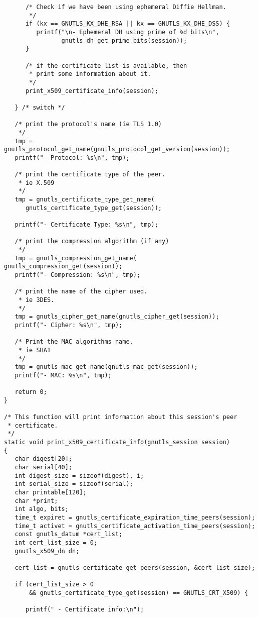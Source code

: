 \begin{verbatim}
      /* Check if we have been using ephemeral Diffie Hellman.
       */
      if (kx == GNUTLS_KX_DHE_RSA || kx == GNUTLS_KX_DHE_DSS) {
         printf("\n- Ephemeral DH using prime of %d bits\n",
                gnutls_dh_get_prime_bits(session));
      }

      /* if the certificate list is available, then
       * print some information about it.
       */
      print_x509_certificate_info(session);

   } /* switch */

   /* print the protocol's name (ie TLS 1.0) 
    */
   tmp = gnutls_protocol_get_name(gnutls_protocol_get_version(session));
   printf("- Protocol: %s\n", tmp);

   /* print the certificate type of the peer.
    * ie X.509
    */
   tmp = gnutls_certificate_type_get_name(
      gnutls_certificate_type_get(session));

   printf("- Certificate Type: %s\n", tmp);

   /* print the compression algorithm (if any)
    */
   tmp = gnutls_compression_get_name( gnutls_compression_get(session));
   printf("- Compression: %s\n", tmp);

   /* print the name of the cipher used.
    * ie 3DES.
    */
   tmp = gnutls_cipher_get_name(gnutls_cipher_get(session));
   printf("- Cipher: %s\n", tmp);

   /* Print the MAC algorithms name.
    * ie SHA1
    */
   tmp = gnutls_mac_get_name(gnutls_mac_get(session));
   printf("- MAC: %s\n", tmp);

   return 0;
}

/* This function will print information about this session's peer
 * certificate. 
 */
static void print_x509_certificate_info(gnutls_session session)
{
   char digest[20];
   char serial[40];
   int digest_size = sizeof(digest), i;
   int serial_size = sizeof(serial);
   char printable[120];
   char *print;
   int algo, bits;
   time_t expiret = gnutls_certificate_expiration_time_peers(session);
   time_t activet = gnutls_certificate_activation_time_peers(session);
   const gnutls_datum *cert_list;
   int cert_list_size = 0;
   gnutls_x509_dn dn;

   cert_list = gnutls_certificate_get_peers(session, &cert_list_size);

   if (cert_list_size > 0
       && gnutls_certificate_type_get(session) == GNUTLS_CRT_X509) {

      printf(" - Certificate info:\n");


\end{verbatim}
